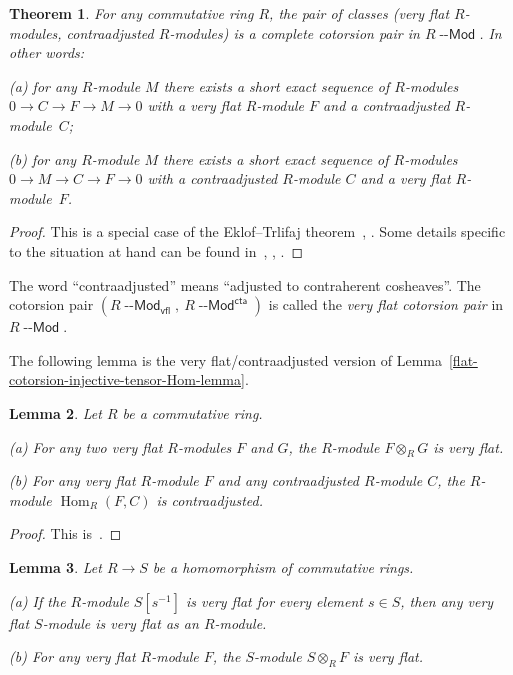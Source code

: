 \documentclass[12pt,a4paper]{amsart}
\newcommand{\+}{\nobreakdash-}
\renewcommand{\:}{\colon}
\newcommand{\rarrow}{\longrightarrow}
\newcommand{\ot}{\otimes}
\DeclareMathOperator{\Hom}{Hom}
\newcommand{\Modl}{{\operatorname{\mathsf{--Mod}}}}
\newcommand{\vfl}{\mathsf{vfl}}
\newcommand{\cta}{\mathsf{cta}}
\theoremstyle{plain}
\newtheorem{thm}{Theorem}[section]
\newtheorem{lem}[thm]{Lemma}
\theoremstyle{definition}
\begin{document}
\begin{thm} \label{very-flat-cotorsion-pair}
 For any commutative ring $R$, the pair of classes (very flat
$R$\+modules, contraadjusted $R$\+modules) is a complete cotorsion
pair in $R\Modl$.
 In other words: \par
\textup{(a)} for any $R$\+module $M$ there exists a short exact
sequence of $R$\+modules\/ $0\rarrow C\rarrow F\rarrow M\rarrow0$ with
a very flat $R$\+module $F$ and a contraadjusted $R$\+module~$C$; \par
\textup{(b)} for any $R$\+module $M$ there exists a short exact
sequence of $R$\+modules\/ $0\rarrow M\rarrow C\rarrow F\rarrow0$ with
a contraadjusted $R$\+module $C$ and a very flat $R$\+module~$F$.
\end{thm}

\begin{proof}
 This is a special case of the Eklof--Trlifaj
theorem~\cite[Theorems~2 and~10]{ET}, \cite[Theorem~6.11]{GT}.
 Some details specific to the situation at hand can be found
in~\cite[Theorem~1.1.1]{Pcosh}, \cite{ST}, \cite[Theorem~4.5]{Pphil}.
\end{proof}

 The word ``contraadjusted'' means ``adjusted to contraherent
cosheaves''.
 The cotorsion pair $(R\Modl_\vfl,\allowbreak\>R\Modl^\cta)$ is called
the \emph{very flat cotorsion pair} in $R\Modl$.

 The following lemma is the very flat/contraadjusted version of
Lemma~\ref{flat-cotorsion-injective-tensor-Hom-lemma}.

\begin{lem} \label{vfl-cta-tensor-Hom-lemma}
 Let $R$ be a commutative ring. \par
\textup{(a)} For any two very flat $R$\+modules $F$ and $G$,
the $R$\+module $F\ot_RG$ is very flat. \par
\textup{(b)} For any very flat $R$\+module $F$ and any contraadjusted
$R$\+module $C$, the $R$\+module\/ $\Hom_R(F,C)$ is contraadjusted.
\end{lem}

\begin{proof}
 This is~\cite[Lemma~1.2.1]{Pcosh}.
\end{proof}

\begin{lem} \label{very-flat-change-of-scalars-lemma}
 Let $R\rarrow S$ be a homomorphism of commutative rings. \par
\textup{(a)} If the $R$\+module $S[s^{-1}]$ is very flat for every
element $s\in S$, then any very flat $S$\+module is very flat as
an $R$\+module. \par
\textup{(b)} For any very flat $R$\+module $F$, the $S$\+module
$S\ot_RF$ is very flat.
\end{lem}
\end{document}
